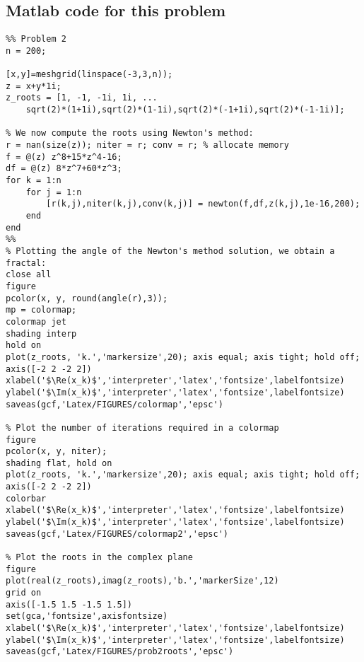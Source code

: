 \subsection*{Matlab code for this problem}
\begin{verbatim}
%% Problem 2
n = 200;

[x,y]=meshgrid(linspace(-3,3,n));
z = x+y*1i;
z_roots = [1, -1, -1i, 1i, ...
    sqrt(2)*(1+1i),sqrt(2)*(1-1i),sqrt(2)*(-1+1i),sqrt(2)*(-1-1i)];

% We now compute the roots using Newton's method:
r = nan(size(z)); niter = r; conv = r; % allocate memory
f = @(z) z^8+15*z^4-16;
df = @(z) 8*z^7+60*z^3;
for k = 1:n
    for j = 1:n
        [r(k,j),niter(k,j),conv(k,j)] = newton(f,df,z(k,j),1e-16,200);
    end
end
%%
% Plotting the angle of the Newton's method solution, we obtain a fractal:
close all
figure
pcolor(x, y, round(angle(r),3));
mp = colormap;
colormap jet
shading interp
hold on
plot(z_roots, 'k.','markersize',20); axis equal; axis tight; hold off;
axis([-2 2 -2 2])
xlabel('$\Re(x_k)$','interpreter','latex','fontsize',labelfontsize)
ylabel('$\Im(x_k)$','interpreter','latex','fontsize',labelfontsize)
saveas(gcf,'Latex/FIGURES/colormap','epsc')

% Plot the number of iterations required in a colormap
figure
pcolor(x, y, niter);
shading flat, hold on
plot(z_roots, 'k.','markersize',20); axis equal; axis tight; hold off;
axis([-2 2 -2 2])
colorbar
xlabel('$\Re(x_k)$','interpreter','latex','fontsize',labelfontsize)
ylabel('$\Im(x_k)$','interpreter','latex','fontsize',labelfontsize)
saveas(gcf,'Latex/FIGURES/colormap2','epsc')

% Plot the roots in the complex plane
figure
plot(real(z_roots),imag(z_roots),'b.','markerSize',12)
grid on
axis([-1.5 1.5 -1.5 1.5])
set(gca,'fontsize',axisfontsize)
xlabel('$\Re(x_k)$','interpreter','latex','fontsize',labelfontsize)
ylabel('$\Im(x_k)$','interpreter','latex','fontsize',labelfontsize)
saveas(gcf,'Latex/FIGURES/prob2roots','epsc')
\end{verbatim}